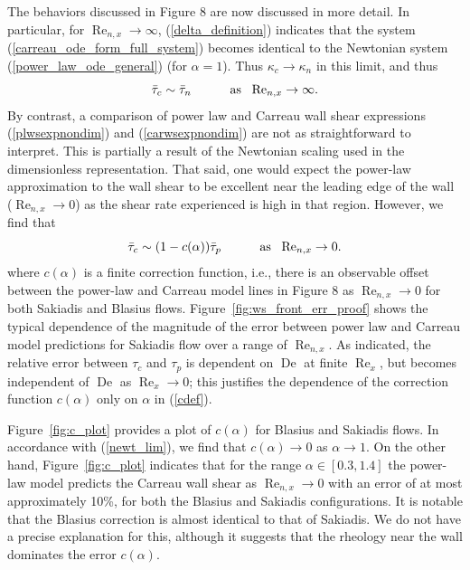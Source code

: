 \documentclass[lineno]{JFM-FLM_Au}
\begin{document}
The behaviors discussed in Figure 8 are now discussed in more detail. In particular,  for $\operatorname{Re}_{n,x} \to \infty $, (\ref{delta_definition}) indicates that the system (\ref{carreau_ode_form_full_system}) becomes identical to the Newtonian system (\ref{power_law_ode_general}) (for $\alpha=1$).  Thus $\kappa_c \to \kappa_n$ in this limit, and thus\begin{equation}
    \bar{\tau}_c \sim \bar{\tau}_n \hphantom{\sum\sum} \mathrm{as}~~\operatorname{Re}_{n, x} \to \infty. \label{newt_lim}
\end{equation} By contrast, a comparison of power law and Carreau wall shear expressions (\ref{plwsexpnondim}) and (\ref{carwsexpnondim}) are not as straightforward to interpret. This is partially a result of the Newtonian scaling used in the dimensionless representation.  That said, one would expect the power-law approximation to the wall shear to be excellent near the leading edge of the wall ($\operatorname{Re}_{n, x} \to 0$) as the shear rate experienced is high in that region.  However, we find that \begin{equation}
    \bar{\tau}_c \sim (1 - c(\alpha)) \bar{\tau}_p \hphantom{\sum\sum} \mathrm{as}~~\operatorname{Re}_{n, x} \to 0. \label{cdef}
\end{equation} where $c(\alpha)$ is a finite correction function, i.e., there is an observable offset between the power-law and Carreau model lines in Figure 8 as $\operatorname{Re}_{n, x} \to 0$  for both Sakiadis and Blasius flows.  Figure~\ref{fig:ws_front_err_proof} shows the typical dependence of the magnitude of the error between power law and Carreau model predictions for Sakiadis flow over a range of $\operatorname{Re}_{n, x}$. As indicated, the relative error between $\tau_c$ and $\tau_p$ is dependent on $\operatorname{De}$ at finite $\operatorname{Re}_x$, but becomes independent of $\operatorname{De}$ as $\operatorname{Re}_x \to 0$; this justifies the dependence of the correction function $c(\alpha)$ only on $\alpha$ in (\ref{cdef}).

Figure~\ref{fig:c_plot} provides a plot of $c(\alpha)$ for Blasius and Sakiadis flows. In accordance with (\ref{newt_lim}), we find that $c(\alpha) \to 0$ as $\alpha \to 1$.  On the other hand, Figure~\ref{fig:c_plot} indicates that for the range $\alpha \in [0.3, 1.4]$ the power-law model predicts the Carreau wall shear as $\operatorname{Re}_{n, x} \to 0$ with an error of at most approximately 10\%, for both the Blasius and Sakiadis configurations. It is notable that the Blasius correction is almost identical to that of Sakiadis. We do not have a precise explanation for this, although it suggests that the rheology near the wall dominates the error $c(\alpha)$.
\end{document}
